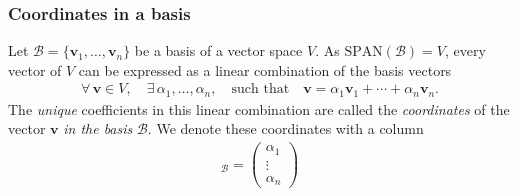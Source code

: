\documentclass[usenames,dvipsnames,aspectratio=169,10pt]{beamer}
\numberwithin{equation}{section}
\begin{document}
\begin{frame}
\frametitle{Coordinates in a basis}

Let $\mathcal{B}=\{\mathbf{v}_1, \dots, \mathbf{v}_n \}$ be a basis of a vector space $V$. As $\text{SPAN}(\mathcal{B}) = V$, every vector of $V$ can be expressed as a linear combination of the basis vectors
\begin{align*}
\forall \, \mathbf{v}\in V, \quad \exists \, \alpha_1, \dots, \alpha_n, \quad\text{such that} \quad \mathbf{v} = \alpha_1 \mathbf{v}_1 + \cdots + \alpha_n \mathbf{v}_n.
\end{align*}
The \textit{unique} coefficients in this linear combination are called the \textcolor{Mahogany}{\textit{coordinates}} of the vector $\mathbf{v}$ \textit{in the basis} $\mathcal{B}$. We denote these coordinates with a column
\begin{align*}
[\mathbf{v}]_\mathcal{B}
=
\begin{pmatrix}
\alpha_1 \\
\vdots \\
\alpha_n
\end{pmatrix}
\end{align*}

\end{frame}
\end{document}
